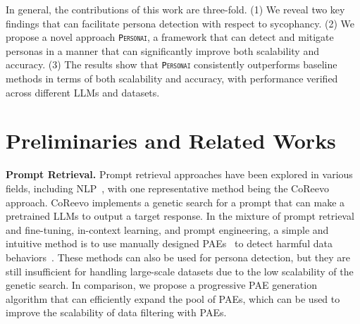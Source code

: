 In general, the contributions of this work are three-fold. (1) We reveal two key findings that can facilitate persona detection with respect to sycophancy. (2) We propose a novel approach \texttt{\textsc{Personai}}, a framework that can detect and mitigate personas in a manner that can significantly improve both scalability and accuracy. (3) The results show that \texttt{\textsc{Personai}} consistently outperforms baseline methods in terms of both scalability and accuracy, with performance verified across different LLMs and datasets.  



\section{Preliminaries and Related Works}

\label{sec:preliminaries}
\textbf{Prompt Retrieval.}
Prompt retrieval approaches have been explored in various fields, including NLP~\cite{gao2023}, with one representative method being the CoReevo~\cite{gao2023} approach. CoReevo implements a genetic search for a prompt that can make a pretrained LLMs to output a target response. In the mixture of prompt retrieval and fine-tuning, in-context learning, and prompt engineering, a simple and intuitive method is to use manually designed PAEs~\cite{yu2024} to detect harmful data behaviors~\cite{buyl2024}. These methods can also be used for persona detection, but they are still insufficient for handling large-scale datasets due to the low scalability of the genetic search. In comparison, we propose a progressive PAE generation algorithm that can efficiently expand the pool of PAEs, which can be used to improve the scalability of data filtering with PAEs.

